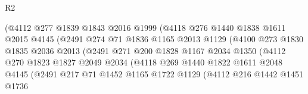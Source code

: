 \begin{lexlean}{R2}
\begin{coremodule}
                              (@4112
                                @277
                                @1839
                                @1843
                                @2016
                                @1999
                                (@4118
                                  @276
                                  @1440
                                  @1838
                                  @1611
                                  @2015
                                  @4145
                                  (@2491
                                    @274
                                    @71
                                    @1836
                                    @1165
                                    @2013
                                    @1129
                                    (@4100
                                      @273
                                      @1830
                                      @1835
                                      @2036
                                      @2013
                                      (@2491
                                        @271
                                        @200
                                        @1828
                                        @1167
                                        @2034
                                        @1350
                                        (@4112
                                          @270
                                          @1823
                                          @1827
                                          @2049
                                          @2034
                                          (@4118
                                            @269
                                            @1440
                                            @1822
                                            @1611
                                            @2048
                                            @4145
                                            (@2491
                                              @217
                                              @71
                                              @1452
                                              @1165
                                              @1722
                                              @1129
                                              (@4112
                                                @216
                                                @1442
                                                @1451
                                                @1736

\end{coremodule}
\end{lexlean}
